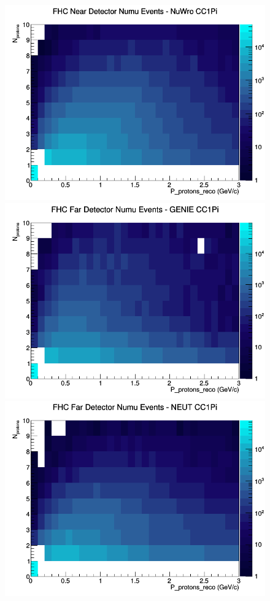 \documentclass[12pt]{article}
\begin{document}
\begin{figure}[h]
\includegraphics[width=\linewidth]{eff_N_P/LAr/protons/CC1Pi_FHC_ND_numu_N_P_NuWro.png}
\endminipage
\newline
{}
\includegraphics[width=\linewidth]{eff_N_P/LAr/protons/CC1Pi_FHC_FD_numu_N_P_GENIE.png}
\endminipage
{}
\includegraphics[width=\linewidth]{eff_N_P/LAr/protons/CC1Pi_FHC_FD_numu_N_P_NEUT.png}

\end{figure}
\end{document}
